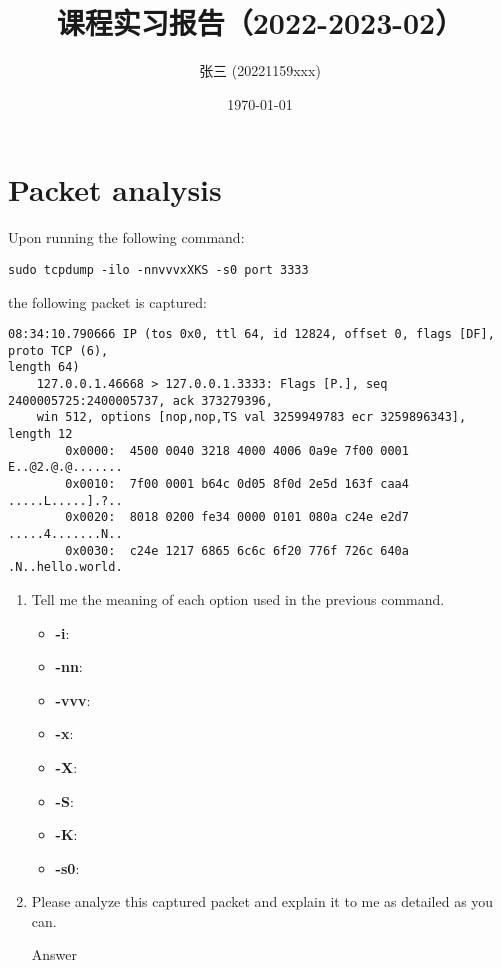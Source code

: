\documentclass{wx672ctexart} \usepackage{hyperref}
\author{张三 (20221159xxx)}
\date{\today}
\title{课程实习报告（2022-2023-02）}
\begin{document}
\maketitle
\tableofcontents


\section{Packet analysis}
\label{sec:orgdfaf11c}
Upon running the following command:

\begin{verbatim}
sudo tcpdump -ilo -nnvvvxXKS -s0 port 3333
\end{verbatim}

the following packet is captured:

\begin{verbatim}
08:34:10.790666 IP (tos 0x0, ttl 64, id 12824, offset 0, flags [DF], proto TCP (6),
length 64)
    127.0.0.1.46668 > 127.0.0.1.3333: Flags [P.], seq 2400005725:2400005737, ack 373279396,
    win 512, options [nop,nop,TS val 3259949783 ecr 3259896343], length 12
        0x0000:  4500 0040 3218 4000 4006 0a9e 7f00 0001  E..@2.@.@.......
        0x0010:  7f00 0001 b64c 0d05 8f0d 2e5d 163f caa4  .....L.....].?..
        0x0020:  8018 0200 fe34 0000 0101 080a c24e e2d7  .....4.......N..
        0x0030:  c24e 1217 6865 6c6c 6f20 776f 726c 640a  .N..hello.world.
\end{verbatim}

\begin{enumerate}
\item Tell me the meaning of each option used in the previous command.
\begin{itemize}
\item \textbf{-i}:
\item \textbf{-nn}:
\item \textbf{-vvv}:
\item \textbf{-x}:
\item \textbf{-X}:
\item \textbf{-S}:
\item \textbf{-K}:
\item \textbf{-s0}:
\end{itemize}

\item Please analyze this captured packet and explain it to me as detailed as you can.     
\begin{description}
\item[{Answer}] 
\end{description}
\end{enumerate}
\end{document}
